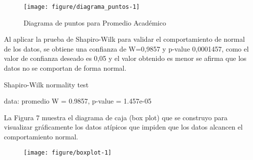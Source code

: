 \begin{itemize}
	\begin{figure}[ht]
		\centering
\begin{kframe}
\begin{alltt}
        \hlopt{$} \hlstd{=}\hlstd{,} \hlstd{=}\hlstd{,} \hlstd{=}\hlstd{)}
\end{alltt}
\end{kframe}
\texttt{[image: figure/diagrama\_puntos-1]} 

		\caption{Diagrama de puntos para Promedio Académico}
		\label{fig:diagrama_puntos}
	\end{figure}

	Al aplicar la prueba de Shapiro-Wilk para validar el comportamiento de normal de los datos, se obtiene una confianza de W=0,9857 y p-value 0,0001457, como el valor de confianza deseado es 0,05 y el valor obtenido es menor se afirma que los datos no se comportan de forma normal.
	
	\begin{center}
		\bigskip
\begin{kframe}
\begin{alltt}
         
\end{alltt}
\end{kframe}
	Shapiro-Wilk normality test

data:  promedio
W = 0.9857, p-value = 1.457e-05


	\end{center}
			
	\bigskip
	La Figura 7 muestra el diagrama de caja (box plot) que se construyo para visualizar gráficamente los datos atípicos que impiden que los datos alcancen el comportamiento normal.
		
	\begin{figure}[ht]
		\centering
\begin{kframe}
\begin{alltt}
        \hlopt{$}  \hlstd{=}\hlstd{,} \hlstd{=}\hlstd{,} \hlstd{=}\hlstd{,} \hlstd{=}\hlstd{)}
\end{alltt}
\end{kframe}
\texttt{[image: figure/boxplot-1]} 


\end{figure}
\end{itemize}
